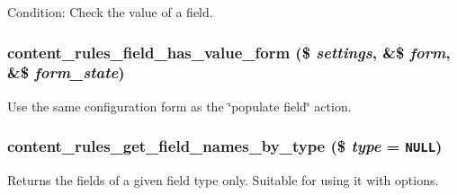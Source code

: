Condition: Check the value of a field. \hypertarget{content_8rules_8inc_58473b6706e8edcb5bac658874c20ea4}{
\subsubsection[{content\_\-rules\_\-field\_\-has\_\-value\_\-form}]{\setlength{\rightskip}{0pt plus 5cm}content\_\-rules\_\-field\_\-has\_\-value\_\-form (\$ {\em settings}, \/  \&\$ {\em form}, \/  \&\$ {\em form\_\-state})}}
\label{content_8rules_8inc_58473b6706e8edcb5bac658874c20ea4}


Use the same configuration form as the \char`\"{}populate field\char`\"{} action. \hypertarget{content_8rules_8inc_dc04222eaffae3195a9ab13595df730f}{
\subsubsection[{content\_\-rules\_\-get\_\-field\_\-names\_\-by\_\-type}]{\setlength{\rightskip}{0pt plus 5cm}content\_\-rules\_\-get\_\-field\_\-names\_\-by\_\-type (\$ {\em type} = {\tt NULL})}}
\label{content_8rules_8inc_dc04222eaffae3195a9ab13595df730f}


Returns the fields of a given field type only. Suitable for using it with options. 